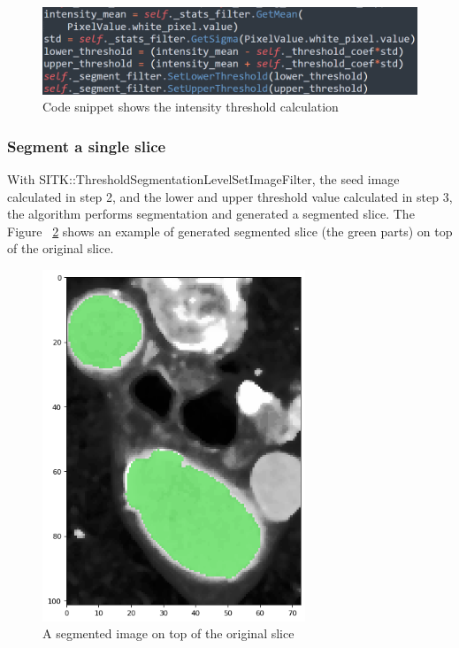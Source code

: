 \begin{figure}[H]
    \centering
    \includegraphics[width=\textwidth]{figures/AGR/threshold.png}
    \caption[Code that shows how to calculate the threshold range]{Code snippet shows the intensity threshold calculation}
    \label{fig_threshold}
\end{figure}

\subsubsection{Segment a single slice}
With SITK::ThresholdSegmentationLevelSetImageFilter, the seed image calculated in step 2, and the lower and upper threshold value calculated in step 3, the algorithm performs segmentation and generated a segmented slice. The Figure ~\ref{fig_segmented_image} shows an example of generated segmented slice (the green parts) on top of the original slice.

\begin{figure}[H]
    \centering
    \includegraphics[width=0.7\textwidth]{figures/AGR/segment_label_image.png}
    \caption[A segmented image]{A segmented image on top of the original slice}
    \label{fig_segmented_image}
\end{figure}

